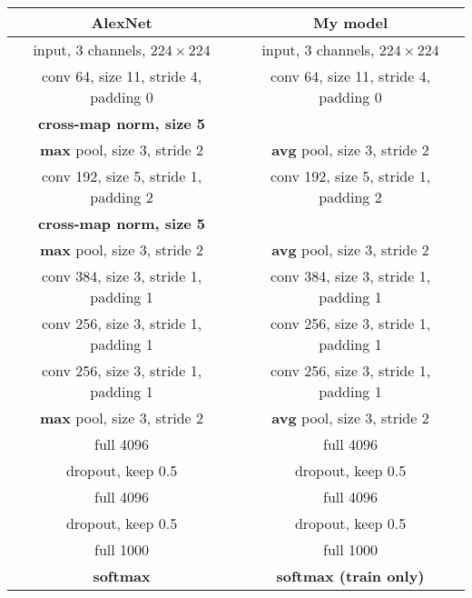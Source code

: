 \begin{table}
  \centering
  \begin{tabular}{cc}
    AlexNet & My model \\\hline\hline
    input, 3 channels, $224 \times 224$ & input, 3 channels, $224 \times 224$ \\\hline
    conv 64, size 11, stride 4, padding 0 & conv 64, size 11, stride 4, padding 0 \\
    \textbf{cross-map norm, size 5} & \\
    \textbf{max} pool, size 3, stride 2 & \textbf{avg} pool, size 3, stride 2 \\\hline
    conv 192, size 5, stride 1, padding 2 & conv 192, size 5, stride 1, padding 2 \\
    \textbf{cross-map norm, size 5} & \\
    \textbf{max} pool, size 3, stride 2 & \textbf{avg} pool, size 3, stride 2 \\\hline
    conv 384, size 3, stride 1, padding 1 & conv 384, size 3, stride 1, padding 1 \\
    conv 256, size 3, stride 1, padding 1 & conv 256, size 3, stride 1, padding 1 \\
    conv 256, size 3, stride 1, padding 1 & conv 256, size 3, stride 1, padding 1 \\
    \textbf{max} pool, size 3, stride 2 & \textbf{avg} pool, size 3, stride 2 \\\hline
    full 4096 & full 4096 \\
    dropout, keep 0.5 & dropout, keep 0.5 \\
    full 4096 & full 4096 \\
    dropout, keep 0.5 & dropout, keep 0.5 \\
    full 1000 & full 1000 \\
    \textbf{softmax} & \textbf{softmax (train only)} \\
  \end{tabular}
\end{table}

